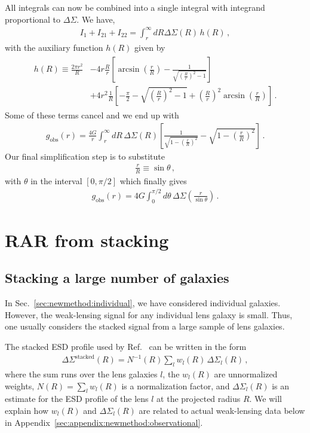 \documentclass[a4paper,11pt]{article}
\begin{document}
All integrals can now be combined into a single integral with integrand proportional to $\Delta \Sigma$.
We have,
\begin{align}
 I_1 + I_{21} + I_{22} =  \int_r^\infty dR \Delta \Sigma(R) \, h(R) \,,
\end{align}
with the auxiliary function $h(R)$ given by
\begin{align}
\begin{split}
h(R) \equiv
   \frac{2 \pi r^2}{R}
   &- 4r \frac{R}{r} \left[ \arcsin\left(\frac{r}{R}\right) - \frac{1}{\sqrt{\left(\frac{R}{r}\right)^2 - 1}} \right]\\
   &+ 4r^2 \frac{1}{R} \left[
    -\frac{\pi}{2}
    -\sqrt{\left(\frac{R}{r}\right)^2-1}
    +\left(\frac{R}{r}\right)^2 \arcsin\left(\frac{r}{R}\right)
   \right] \,.
\end{split}
\end{align}
Some of these terms cancel and we end up with
\begin{align}
g_{\mathrm{obs}}(r) = \frac{4G}{r} \int_r^\infty dR \, \Delta \Sigma(R) \left[\frac{1}{\sqrt{1 - \left(\frac{r}{R}\right)^2}} - \sqrt{1 - \left(\frac{r}{R}\right)^2}\right] \,.
\end{align}
Our final simplification step is to substitute
\begin{align}
 \frac{r}{R} \equiv \sin \theta \,,
\end{align}
with $\theta$ in the interval $[0, \pi/2]$ which finally gives
\begin{align}
g_{\mathrm{obs}}(r) = 4G \int_0^{\pi/2} d\theta \, \Delta \Sigma\left(\frac{r}{\sin \theta}\right) \,.
\end{align}

\section{RAR from stacking}
\label{sec:appendix:newmethod}

\subsection{Stacking a large number of galaxies}
\label{sec:appendix:newmethod:stacked}

In Sec.~\ref{sec:newmethod:individual}, we have considered individual galaxies.
However, the weak-lensing signal for any individual lens galaxy is small.
Thus, one usually considers the stacked signal from a large sample of lens galaxies.

The stacked ESD profile used by Ref.~\cite{Brouwer2021} can be written in the form
\begin{align}
 \label{eq:esd_stacked}
 \Delta \Sigma^{\mathrm{stacked}}(R) = N^{-1}(R) \sum_l w_l(R) \, \Delta \Sigma_l(R) \,,
\end{align}
where the sum runs over the lens galaxies $l$, the $w_l(R)$ are unnormalized weights, $N(R) = \sum_l w_l(R)$ is a normalization factor, and $\Delta \Sigma_l(R)$ is an estimate for the ESD profile of the lens $l$ at the projected radius $R$.
We will explain how $w_l(R)$ and $\Delta \Sigma_l(R)$ are related to actual weak-lensing data below in Appendix~\ref{sec:appendix:newmethod:observational}.
\end{document}
